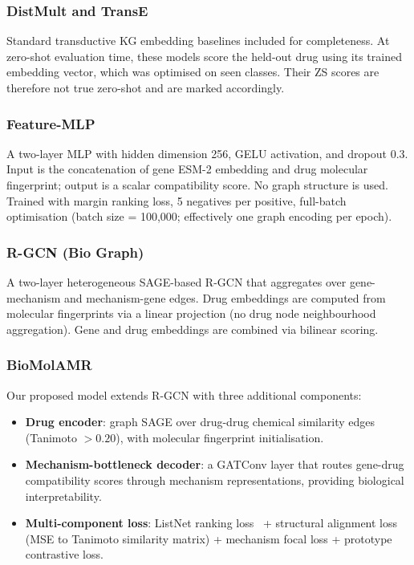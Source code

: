 \documentclass[conference]{IEEEtran}
\begin{document}
\subsubsection{DistMult and TransE}
Standard transductive KG embedding baselines included for completeness.
At zero-shot evaluation time, these models score the held-out drug using its
trained embedding vector, which was optimised on seen classes. Their ZS scores
are therefore not true zero-shot and are marked accordingly.

\subsubsection{Feature-MLP}
A two-layer MLP with hidden dimension 256, GELU activation, and dropout 0.3.
Input is the concatenation of gene ESM-2 embedding and drug molecular
fingerprint; output is a scalar compatibility score. No graph structure is used.
Trained with margin ranking loss, 5 negatives per positive, full-batch
optimisation (batch size = 100,000; effectively one graph encoding per epoch).

\subsubsection{R-GCN (Bio Graph)}
A two-layer heterogeneous SAGE-based R-GCN that aggregates over gene-mechanism
and mechanism-gene edges. Drug embeddings are computed from molecular
fingerprints via a linear projection (no drug node neighbourhood aggregation).
Gene and drug embeddings are combined via bilinear scoring.

\subsubsection{BioMolAMR}
Our proposed model extends R-GCN with three additional components:
\begin{itemize}
  \item \textbf{Drug encoder}: graph SAGE over drug-drug chemical similarity
    edges (Tanimoto $> 0.20$), with molecular fingerprint initialisation.
  \item \textbf{Mechanism-bottleneck decoder}: a GATConv layer that routes
    gene-drug compatibility scores through mechanism representations, providing
    biological interpretability.
  \item \textbf{Multi-component loss}: ListNet ranking loss~\cite{cao2007listnet}
    + structural alignment loss (MSE to Tanimoto similarity matrix) +
    mechanism focal loss + prototype contrastive loss.
\end{itemize}
\end{document}
